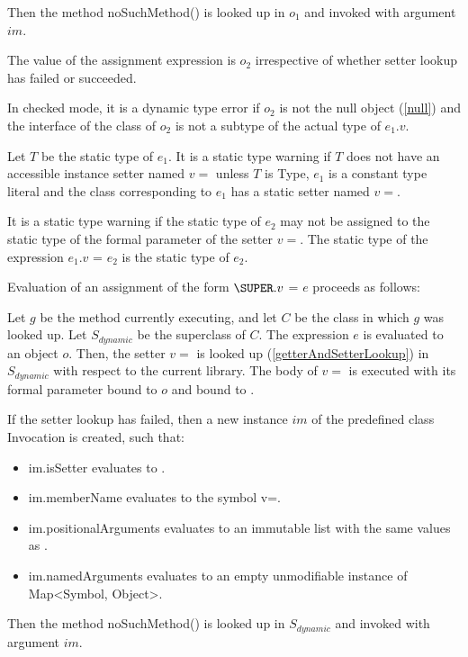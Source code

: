 \documentclass{article}
\newcommand{\code}[1]{{\sf #1}}
\begin{document}
\LMHash{}
Then the method \code{noSuchMethod()} is looked up in $o_1$ and invoked  with argument $im$.

\LMHash{}
The value of the assignment expression is $o_2$ irrespective of whether setter lookup has failed or succeeded.

\LMHash{}
In checked mode, it is a dynamic type error if $o_2$ is not the null object (\ref{null}) and the interface of the class of $o_2$ is not a subtype of the actual type of $e_1.v$.

\LMHash{}
Let $T$ be the static type of $e_1$. It is a static type warning if $T$ does not have an accessible instance setter named $v=$ unless $T$ is \code{Type}, $e_1$ is a constant type literal and the class corresponding to $e_1$ has a static setter named $v=$.


\LMHash{}
It is a static type warning if the static type of $e_2$ may not be assigned to the static type of the formal parameter of the setter $v=$.   The static type of the expression $e_1.v$ \code{=} $e_2$ is the static type of $e_2$.

\LMHash{}
Evaluation of an assignment of the form $\SUPER.v$ \code{=} $e$ proceeds as follows:

\LMHash{}
Let $g$ be the method currently executing, and let $C$ be the class in which $g$ was looked up.  Let $S_{dynamic}$ be the superclass of $C$.
The expression $e$ is evaluated to an object $o$.  Then, the setter $v=$ is looked up (\ref{getterAndSetterLookup}) in $S_{dynamic}$ with respect to the current library.  The body  of $v=$ is executed with its formal parameter bound to $o$ and \THIS{} bound to \THIS{}.

\LMHash{}
If the setter lookup has failed, then a new instance $im$ of the predefined class \code{Invocation} is created, such that:
\begin{itemize}
\item \code{im.isSetter} evaluates to \code{\TRUE{}}.
\item \code{im.memberName} evaluates to the symbol \code{v=}.
\item \code{im.positionalArguments} evaluates to an immutable list with the same values as \code{[$o$]}.
\item \code{im.namedArguments} evaluates to an empty unmodifiable instance of \code{Map<Symbol, Object>}.
\end{itemize}

\LMHash{}
Then the method \code{noSuchMethod()} is looked up in $S_{dynamic}$ and invoked with argument $im$.
\end{document}
